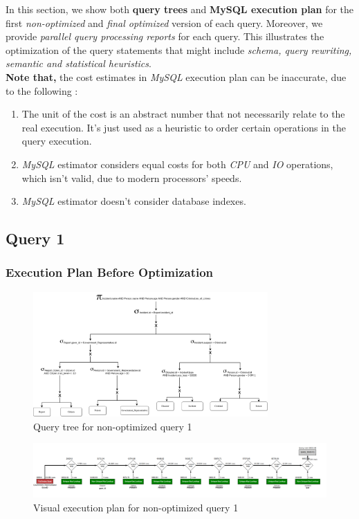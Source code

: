 In this section, we show both \textbf{query trees} and \textbf{MySQL execution plan} for the first \emph{non-optimized} and \emph{final optimized} version of each query. Moreover, we provide \emph{parallel query processing reports} for each query. This illustrates the optimization of the query statements that might include \emph{schema, query rewriting, semantic and statistical heuristics}. \\

\textbf{Note that,} the cost estimates in \emph{MySQL} execution plan can be inaccurate, due to the following :
\begin{enumerate}
    \item The unit of the cost is an abstract number that not necessarily relate to the real execution. It's just used as a heuristic to order certain operations in the query execution.
    \item \emph{MySQL} estimator considers equal costs for both \emph{CPU} and \emph{IO} operations, which isn't valid, due to modern processors' speeds.
    \item \emph{MySQL} estimator doesn't consider database indexes.
\end{enumerate}


\subsection{Query 1}

\subsubsection{Execution Plan Before Optimization}
\begin{figure}[H]
    \centering
    \includegraphics[width=0.8\textwidth]{images/query_trees/query1-non-optimized.png}
    \caption{Query tree for non-optimized query 1}
\end{figure}
\begin{figure}[H]
    \centering
    \includegraphics[width=\textwidth]{images/execution_plans/q1-1-old.png}
    \caption{Visual execution plan for non-optimized query 1}
\end{figure}

